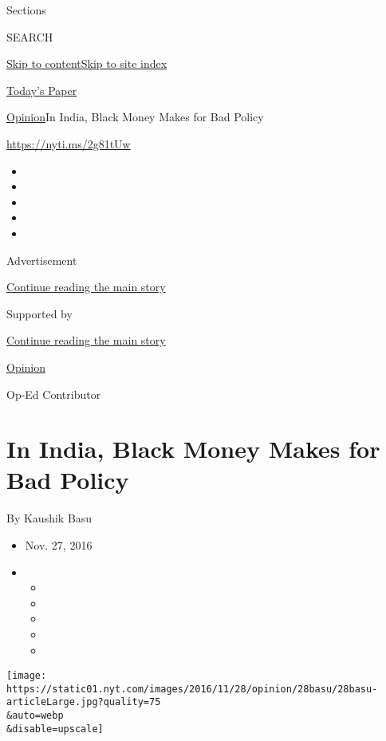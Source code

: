 Sections

SEARCH

\protect\hyperlink{site-content}{Skip to
content}\protect\hyperlink{site-index}{Skip to site index}

\href{https://myaccount.nytimes.com/auth/login?response_type=cookie\&client_id=vi}{}

\href{https://www.nytimes.com/section/todayspaper}{Today's Paper}

\href{/section/opinion}{Opinion}\textbar{}In India, Black Money Makes
for Bad Policy

\url{https://nyti.ms/2g81tUw}

\begin{itemize}
\item
\item
\item
\item
\item
\end{itemize}

Advertisement

\protect\hyperlink{after-top}{Continue reading the main story}

Supported by

\protect\hyperlink{after-sponsor}{Continue reading the main story}

\href{/section/opinion}{Opinion}

Op-Ed Contributor

\hypertarget{in-india-black-money-makes-for-bad-policy}{%
\section{In India, Black Money Makes for Bad
Policy}\label{in-india-black-money-makes-for-bad-policy}}

By Kaushik Basu

\begin{itemize}
\item
  Nov. 27, 2016
\item
  \begin{itemize}
  \item
  \item
  \item
  \item
  \item
  \end{itemize}
\end{itemize}

\texttt{[image: https://static01.nyt.com/images/2016/11/28/opinion/28basu/28basu-articleLarge.jpg?quality=75\\\&auto=webp\\\&disable=upscale]}

